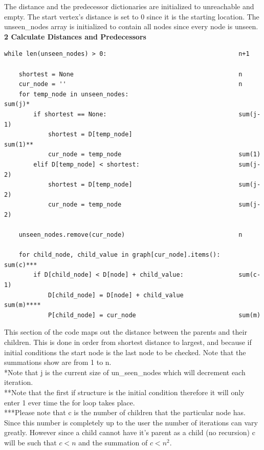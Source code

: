\documentclass[pdftex,12pt,a4paper]{article}
\newcommand{\nspace}{\\[0.25cm]}
\newcommand{\lspace}{\\[0.50cm]}
\begin{document}
The distance and the predecessor dictionaries are initialized to unreachable and empty. The start vertex's distance is set to 0 since it is the starting location. The unseen\_nodes array is initialized to contain all nodes since every node is unseen.\lspace


{\bf \large 2 Calculate Distances and Predecessors}
\begin{verbatim}
while len(unseen_nodes) > 0:                                    n+1

    shortest = None                                             n
    cur_node = ''                                               n
    for temp_node in unseen_nodes:                              sum(j)*
        if shortest == None:                                    sum(j-1)
            shortest = D[temp_node]                             sum(1)**
            cur_node = temp_node                                sum(1)
        elif D[temp_node] < shortest:                           sum(j-2)
            shortest = D[temp_node]                             sum(j-2)
            cur_node = temp_node                                sum(j-2)

    unseen_nodes.remove(cur_node)                               n

    for child_node, child_value in graph[cur_node].items():     sum(c)***
        if D[child_node] < D[node] + child_value:               sum(c-1)
            D[child_node] = D[node] + child_value               sum(m)****
            P[child_node] = cur_node                            sum(m)
\end{verbatim}

This section of the code maps out the distance between the parents and their children. This is done in order from shortest distance to largest, and because if initial conditions the start node is the last node to be checked. Note that the summations show are from 1 to n.\nspace

*Note that j is the current size of un\_seen\_nodes which will decrement each iteration.\nspace

**Note that the first if structure is the initial condition therefore it will only enter 1 ever time the for loop takes place.\nspace

***Please note that c is the number of children that the particular node has. Since this number is completely up to the user the number of iterations can vary greatly. However since a child cannot have it's parent as a child (no recursion) c will be such that $c < n$ and the summation of $c < n^2$.\nspace
\end{document}
